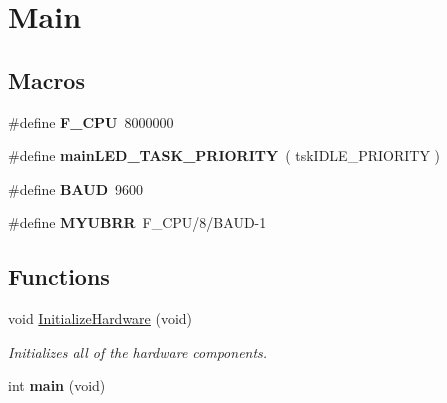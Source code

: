 \hypertarget{group__main}{}\section{Main}
\label{group__main}
\subsection*{Macros}
\begin{DoxyCompactItemize}
\item 
\hypertarget{group__main_ga43bafb28b29491ec7f871319b5a3b2f8}{}\#define {\bfseries F\+\_\+\+C\+P\+U}~8000000\label{group__main_ga43bafb28b29491ec7f871319b5a3b2f8}

\item 
\hypertarget{group__main_gad1776ca98c5dc452bed0bfa17e20fd01}{}\#define {\bfseries main\+L\+E\+D\+\_\+\+T\+A\+S\+K\+\_\+\+P\+R\+I\+O\+R\+I\+T\+Y}~( tsk\+I\+D\+L\+E\+\_\+\+P\+R\+I\+O\+R\+I\+T\+Y )\label{group__main_gad1776ca98c5dc452bed0bfa17e20fd01}

\item 
\hypertarget{group__main_ga62634036639f88eece6fbf226b45f84b}{}\#define {\bfseries B\+A\+U\+D}~9600\label{group__main_ga62634036639f88eece6fbf226b45f84b}

\item 
\hypertarget{group__main_ga711e9130c825a7269c8c87dbb57a85e0}{}\#define {\bfseries M\+Y\+U\+B\+R\+R}~F\+\_\+\+C\+P\+U/8/B\+A\+U\+D-\/1\label{group__main_ga711e9130c825a7269c8c87dbb57a85e0}

\end{DoxyCompactItemize}
\subsection*{Functions}
\begin{DoxyCompactItemize}
\item 
void \hyperlink{group__main_gaa8e656e1a832e2242eed137d19c899f0}{Initialize\+Hardware} (void)
\begin{DoxyCompactList}\small\item\em Initializes all of the hardware components. \end{DoxyCompactList}\item 
\hypertarget{group__main_ga840291bc02cba5474a4cb46a9b9566fe}{}int {\bfseries main} (void)\label{group__main_ga840291bc02cba5474a4cb46a9b9566fe}

\end{DoxyCompactItemize}


